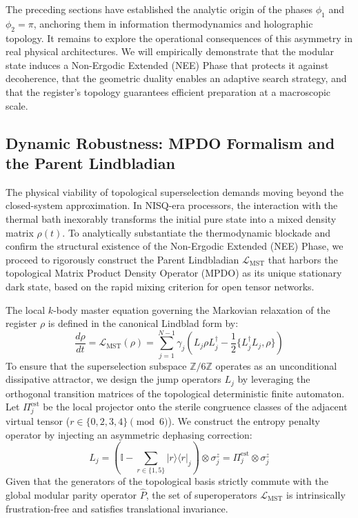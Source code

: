 \documentclass[reprint,aps,pra,superscriptaddress,nofootinbib]{revtex4-2}
\theoremstyle{plain}
\theoremstyle{definition}
\theoremstyle{remark}
\begin{document}
The preceding sections have established the analytic origin of the phases $\phi_1$ and $\phi_2 = \pi$, anchoring them in information thermodynamics and holographic topology. It remains to explore the operational consequences of this asymmetry in real physical architectures. We will empirically demonstrate that the modular state induces a Non-Ergodic Extended (NEE) Phase that protects it against decoherence, that the geometric duality enables an adaptive search strategy, and that the register's topology guarantees efficient preparation at a macroscopic scale.

\subsection{Dynamic Robustness: MPDO Formalism and the Parent Lindbladian}
\label{subsec:robustez_dinamica}

The physical viability of topological superselection demands moving beyond the closed-system approximation. In NISQ-era processors, the interaction with the thermal bath inexorably transforms the initial pure state into a mixed density matrix $\rho(t)$. To analytically substantiate the thermodynamic blockade and confirm the structural existence of the Non-Ergodic Extended (NEE) Phase, we proceed to rigorously construct the Parent Lindbladian $\mathcal{L}_{\text{MST}}$ that harbors the topological Matrix Product Density Operator (MPDO) as its unique stationary dark state, based on the rapid mixing criterion for open tensor networks.

The local $k$-body master equation governing the Markovian relaxation of the register $\rho$ is defined in the canonical Lindblad form \cite{Lindblad1976} by:
\begin{equation}
\frac{d\rho}{dt} = \mathcal{L}_{\text{MST}}(\rho) = \sum_{j=1}^{N-1} \gamma_j \left( L_j \rho L_j^\dagger - \frac{1}{2} \{ L_j^\dagger L_j, \rho \} \right)
\label{eq:lindblad_master}
\end{equation}
To ensure that the superselection subspace $\mathbb{Z}/6\mathbb{Z}$ operates as an unconditional dissipative attractor, we design the jump operators $L_j$ by leveraging the orthogonal transition matrices of the topological deterministic finite automaton. Let $\Pi_j^{\text{est}}$ be the local projector onto the sterile congruence classes of the adjacent virtual tensor ($r \in \{0,2,3,4\} \pmod 6$). We construct the entropy penalty operator by injecting an asymmetric dephasing correction:
\begin{equation}
L_j = \left( \mathbb{I} - \sum_{r \in \{1,5\}} |r\rangle\langle r|_j \right) \otimes \sigma_j^z = \Pi_j^{\text{est}} \otimes \sigma_j^z
\label{eq:jump_operators}
\end{equation}
Given that the generators of the topological basis strictly commute with the global modular parity operator $\hat{P}$, the set of superoperators $\mathcal{L}_{\text{MST}}$ is intrinsically frustration-free and satisfies translational invariance.
\end{document}
